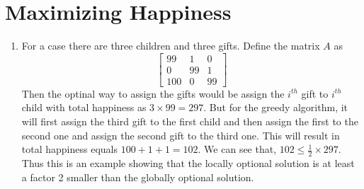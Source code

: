 \documentclass{article}
\newenvironment{claim}[1]{\par\noindent\underline{Claim:}\space#1}{}
\begin{document}
	\section{Maximizing Happiness}
		\begin{enumerate}
			\item  %
			For a case there are three children and three gifts. Define the matrix $A$ as 
			\begin{displaymath}
			\left[
			\begin{matrix}
				99 & 1 & 0 \\
				0 & 99 & 1 \\
				100 & 0 & 99
			\end{matrix}
				\right]
			\end{displaymath}
			Then the optinal way to assign the gifts would be assign the $i^{th}$ gift to $i^{th}$ child with total happiness as $3 \times 99 = 297$. But for the greedy algorithm, it will first assign the third gift to the first child and then assign the first to the second one and assign the second gift to the third one. This will result in total happiness equals $100 + 1 + 1 = 102$. We can see that, $102 \leq \frac{1}{2} \times 297$. Thus this is an example showing that the locally optional solution is at least a factor 2 smaller than the globally optional solution.

\end{enumerate}
\end{document}
